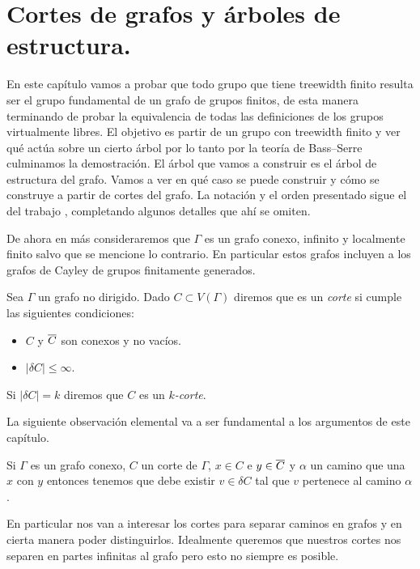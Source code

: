 \documentclass[tesis.tex]{subfiles}
\begin{document}
	
\chapter{Cortes de grafos y árboles de estructura.}

En este capítulo vamos a probar que todo grupo que tiene treewidth finito resulta ser el grupo fundamental de un grafo de grupos finitos, de esta manera terminando de probar la equivalencia de todas las definiciones de los grupos virtualmente libres.
El objetivo es partir de un grupo con treewidth finito y ver qué actúa sobre un cierto árbol por lo tanto por la teoría de Bass--Serre culminamos la demostración.
El árbol que vamos a construir es el árbol de estructura del grafo.
Vamos a ver en qué caso se puede construir y cómo se construye a partir de cortes del grafo. 
La notación y el orden presentado sigue el del trabajo \cite{diekert2013context}, completando algunos detalles que ahí se omiten.

De ahora en más consideraremos que $\Gamma$ es un grafo conexo, infinito y localmente finito salvo que se mencione lo contrario.
En particular estos grafos incluyen a los grafos de Cayley de grupos finitamente generados.

\begin{deff}
	Sea $\Gamma$ un grafo no dirigido.
	Dado $C \subset V(\Gamma)$ diremos que es un \emph{corte} si cumple las siguientes condiciones:
	\begin{itemize}
		\item $C$ y $\overline C$ son conexos y no vacíos.
		\item $|\delta C| \le \infty$.
	\end{itemize}
	Si $|\delta C| = k$ diremos que $C$ es un \emph{$k$-corte}.
\end{deff}	


La siguiente observación elemental va a ser fundamental a los argumentos de este capítulo.

\begin{obs}\label{obs_camino_corte}
	Si $\Gamma$ es un grafo conexo, $C$ un corte de $\Gamma$, $x \in C$ e $y \in \overline C$ y 
	$\alpha$ un camino que una $x$ con $y$ 
	entonces tenemos que debe existir $v \in \delta C$ tal que $v$ pertenece al camino $\alpha$.
\end{obs} 


En particular nos van a interesar los cortes para separar caminos en grafos y en cierta manera poder distinguirlos.
Idealmente queremos que nuestros cortes nos separen en partes infinitas al grafo pero esto no siempre es posible.
\end{document}
